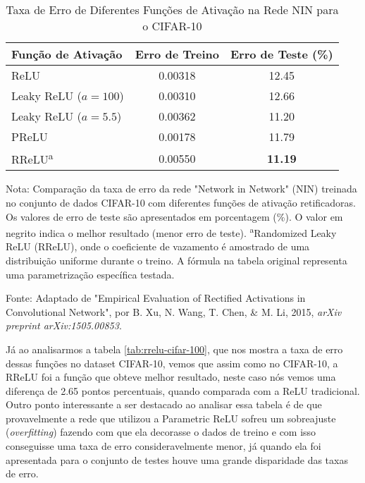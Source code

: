 \begin{table}[ht]
    \centering
    \begin{threeparttable}
        \caption{Taxa de Erro de Diferentes Funções de Ativação na Rede NIN para o CIFAR-10}
        \label{tab:rrelu-cifar-10}
        \begin{tabular}{lcc}
            \toprule
            \textbf{Função de Ativação} & \textbf{Erro de Treino} & \textbf{Erro de Teste (\%)} \\
            \midrule
            
            ReLU                      & 0.00318 & 12.45 \\
            \addlinespace %
            Leaky ReLU ($a=100$)      & 0.00310 & 12.66 \\
            Leaky ReLU ($a=5.5$)      & 0.00362 & 11.20 \\
            \addlinespace
            PReLU                     & 0.00178 & 11.79 \\
            \addlinespace
            RReLU\textsuperscript{a}  & 0.00550 & \textbf{11.19} \\
            
            \bottomrule
        \end{tabular}
        
        \begin{tablenotes}[para]
            \small
            \item[] Nota: Comparação da taxa de erro da rede "Network in Network" (NIN) treinada no conjunto de dados CIFAR-10 com diferentes funções de ativação retificadoras. Os valores de erro de teste são apresentados em porcentagem (\%). O valor em negrito indica o melhor resultado (menor erro de teste). \textsuperscript{a}Randomized Leaky ReLU (RReLU), onde o coeficiente de vazamento é amostrado de uma distribuição uniforme durante o treino. A fórmula na tabela original representa uma parametrização específica testada.
            \item[] Fonte: Adaptado de "Empirical Evaluation of Rectified Activations in Convolutional Network", por B. Xu, N. Wang, T. Chen, \& M. Li, 2015, \textit{arXiv preprint arXiv:1505.00853}.
        \end{tablenotes}

    \end{threeparttable}
\end{table}

Já ao analisarmos a tabela \ref{tab:rrelu-cifar-100}, que nos mostra a taxa de erro dessas funções no dataset CIFAR-10, vemos que assim como no CIFAR-10, a RReLU foi a função que obteve melhor resultado, neste caso nós vemos uma diferença de 2.65 pontos percentuais, quando comparada com a ReLU tradicional. Outro ponto interessante a ser destacado ao analisar essa tabela é de que provavelmente a rede que utilizou a Parametric ReLU sofreu um sobreajuste (\textit{overfitting}) fazendo com que ela decorasse o dados de treino e com isso conseguisse uma taxa de erro consideravelmente menor, já quando ela foi apresentada para o conjunto de testes houve uma grande disparidade das taxas de erro.

